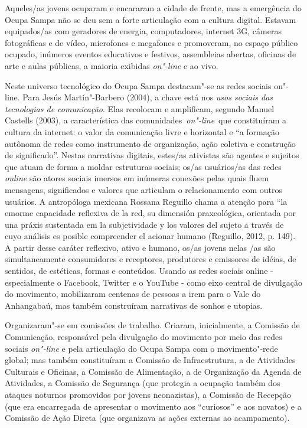 Aqueles/as jovens ocuparam e encararam a cidade de frente, mas a
emergência do Ocupa Sampa não se deu sem a forte articulação com a
cultura digital. Estavam equipados/as com geradores de energia,
computadores, internet 3G, câmeras fotográficas e de vídeo, microfones e
megafones e promoveram, no espaço público ocupado, inúmeros eventos
educativos e festivos, assembleias abertas, oficinas de arte e aulas
públicas, a maioria exibidas \emph{on"-line} e ao vivo.

Neste universo tecnológico do Ocupa Sampa destacam"-se as redes sociais
on"-line. Para Jesús Martín"-Barbero (2004), a chave está nos \emph{usos
sociais das tecnologias de comunicação}. Elas recolocam e amplificam,
segundo Manuel Castells (2003), a característica das
comunidades~\emph{on"-line}~que constituíram a cultura da internet: o
valor da comunicação livre e horizontal e ``a formação autônoma de redes
como instrumento de organização, ação coletiva e construção de
significado''. Nestas narrativas digitais, estes/as ativistas são
agentes e sujeitos que atuam de forma a moldar estruturas sociais; os/as
usuários/as das redes \emph{online} são atores sociais imersos em
inúmeras conexões pelas quais fluem mensagens, significados e valores
que articulam o relacionamento com outros usuários. A antropóloga
mexicana Rossana Reguillo chama a atenção para ``la emorme capacidade
reflexiva de la red, su dimensión praxeológica, orientada por una práxis
sustentada em la subjetividade y los valores del sujeto a través de cuyo
análisis es posible compreender el acionar humano (Reguillo, 2012, p.
149). A partir desse caráter reflexivo, ativo e humano, os/as jovens
nelas /as são simultaneamente consumidores e receptores, produtores e
emissores de idéias, de sentidos, de estéticas, formas e conteúdos.
Usando as redes sociais online - especialmente o Facebook, Twitter e o
YouTube - como eixo central de divulgação do movimento, mobilizaram
centenas de pessoas a irem para o Vale do Anhangabaú, mas também
construíram narrativas de sonhos e utopias.

Organizaram"-se em comissões de trabalho. Criaram, inicialmente, a
Comissão de Comunicação, responsável pela divulgação do movimento por
meio das redes sociais \emph{on"-line} e pela articulação do Ocupa Sampa
com o movimento"-rede global; mas também constituíram a Comissão de
Infraestrutura, a de Atividades Culturais e Oficinas, a Comissão de
Alimentação, a de Organização da Agenda de Atividades, a Comissão de
Segurança (que protegia a ocupação também dos ataques noturnos
promovidos por jovens neonazistas), a Comissão de Recepção (que era
encarregada de apresentar o movimento aos ``curiosos'' e aos novatos) e
a Comissão de Ação Direta (que organizava as ações externas ao
acampamento).

